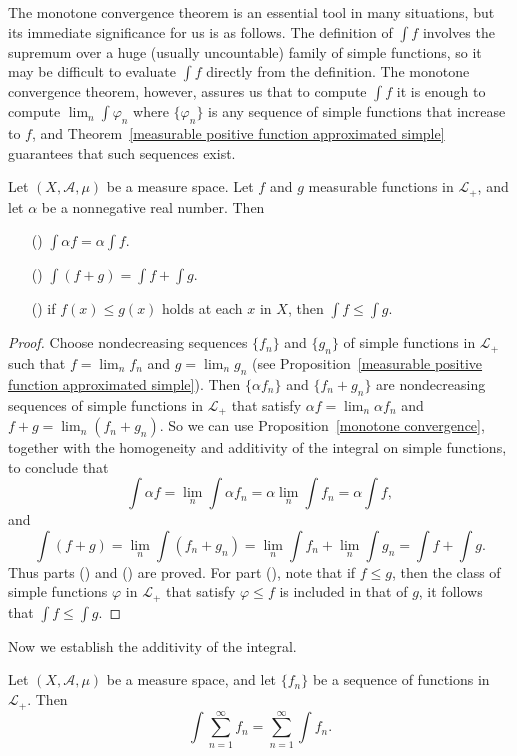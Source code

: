 The monotone convergence theorem is an essential tool in many situations, but its immediate significance for us is as follows. The definition of $\int f$ involves the supremum over a huge (usually uncountable) family of simple functions, so it may be difficult to evaluate $\int f$ directly from the definition. The monotone convergence theorem, however, assures us that to compute $\int f$ it is enough to compute $\lim_n\int\varphi_n$ where $\{\varphi_n\}$ is any sequence of simple functions that increase to $f$, and Theorem~\ref{measurable positive function approximated simple} guarantees that such sequences exist.
\begin{proposition}\label{int positive function prop}
Let $(X,\mathcal{A},\mu)$ be a measure space. Let $f$ and $g$ measurable functions in $\mathcal{L}_+$, and let $\alpha$ be a nonnegative real number. Then
\begin{itemize}
\item[(\rmnum{1})] $\int\alpha f=\alpha\int f$.
\item[(\rmnum{2})] $\int(f+g)=\int f+\int g$.
\item[(\rmnum{3})] if $f(x)\leq g(x)$ holds at each $x$ in $X$, then $\int f\leq\int g$.
\end{itemize}
\end{proposition}
\begin{proof}
Choose nondecreasing sequences $\{f_n\}$ and $\{g_n\}$ of simple functions in $\mathcal{L}_+$ such that $f=\lim_nf_n$ and $g=\lim_ng_n$ (see Proposition~\ref{measurable positive function approximated simple}). Then $\{\alpha f_n\}$ and $\{f_n+g_n\}$ are nondecreasing sequences of simple functions in $\mathcal{L}_+$ that satisfy $\alpha f=\lim_n\alpha f_n$ and $f+g=\lim_n(f_n+g_n)$. So we can use Proposition~\ref{monotone convergence}, together with the homogeneity and additivity of the integral on simple functions, to conclude that
\[\int\alpha f=\lim_n\int \alpha f_n=\alpha\lim_n\int f_n=\alpha\int f,\]
and
\[\int(f+g)=\lim_n\int(f_n+g_n)=\lim_n\int f_n+\lim_n\int g_n=\int f+\int g.\]
Thus parts () and () are proved. For part (), note that if $f\leq g$, then the class of simple functions $\varphi$ in $\mathcal{L}_+$ that satisfy $\varphi\leq f$ is included in that of $g$, it follows that $\int f\leq\int g$.
\end{proof}
Now we establish the additivity of the integral.
\begin{theorem}\label{int sum change}
Let $(X,\mathcal{A},\mu)$ be a measure space, and let $\{f_n\}$ be a sequence of functions in $\mathcal{L}_+$. Then
\[\int\sum_{n=1}^{\infty}f_n=\sum_{n=1}^{\infty}\int f_n.\]
\end{theorem}
